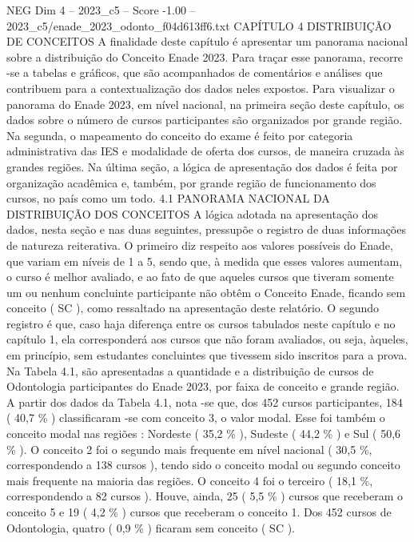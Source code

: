 \begin{textsample}{NEG Dim 4 – 2023\_c5 – Score -1.00 – 2023\_c5/enade\_2023\_odonto\_f04d613ff6.txt}  \label{ex:f4_neg_094}
CAPÍTULO 4 DISTRIBUIÇÃO DE CONCEITOS A finalidade deste capítulo é apresentar um panorama nacional sobre a distribuição do Conceito Enade 2023.
Para traçar esse panorama, recorre -se a tabelas e gráficos, que são acompanhados de comentários e análises que contribuem para a contextualização dos dados neles expostos.
Para visualizar o panorama do Enade 2023, em nível nacional, na primeira seção deste capítulo, os dados sobre o número de cursos participantes são organizados por grande região.
Na segunda, o mapeamento do conceito do exame é feito por categoria administrativa das IES e modalidade de oferta dos cursos, de maneira cruzada às grandes regiões.
Na última seção, a lógica de apresentação dos dados é feita por organização acadêmica e, também, por grande região de funcionamento dos cursos, no país como um todo. 4.1 PANORAMA NACIONAL DA DISTRIBUIÇÃO DOS CONCEITOS A lógica adotada na apresentação dos dados, nesta seção e nas duas seguintes, pressupõe o registro de duas informações de natureza reiterativa.
O primeiro diz respeito aos valores possíveis do Enade, que variam em níveis de 1 a 5, sendo que, à medida que esses valores aumentam, o curso é melhor avaliado, e ao fato de que aqueles cursos que tiveram somente um ou nenhum concluinte participante não obtêm o Conceito Enade, ficando sem conceito ( SC ), como ressaltado na apresentação deste relatório.
O segundo registro é que, caso haja diferença entre os cursos tabulados neste capítulo e no capítulo 1, ela corresponderá aos cursos que não foram avaliados, ou seja, àqueles, em princípio, sem estudantes concluintes que tivessem sido inscritos para a prova.
Na Tabela 4.1, são apresentadas a quantidade e a distribuição de cursos de Odontologia participantes do Enade 2023, por faixa de conceito e grande região.
A partir dos dados da Tabela 4.1, nota -se que, dos 452 cursos participantes, 184 ( 40,7 \% ) classificaram -se com conceito 3, o valor modal.
Esse foi também o conceito modal nas regiões : Nordeste ( 35,2 \% ), Sudeste ( 44,2 \% ) e Sul ( 50,6 \% ).
O conceito 2 foi o segundo mais frequente em nível nacional ( 30,5 \%, correspondendo a 138 cursos ), tendo sido o conceito modal ou segundo conceito mais frequente na maioria das regiões.
O conceito 4 foi o terceiro ( 18,1 \%, correspondendo a 82 cursos ).
Houve, ainda, 25 ( 5,5 \% ) cursos que receberam o conceito 5 e 19 ( 4,2 \% ) cursos que receberam o conceito 1.
Dos 452 cursos de Odontologia, quatro ( 0,9 \% ) ficaram sem conceito ( SC ).

\end{textsample}
